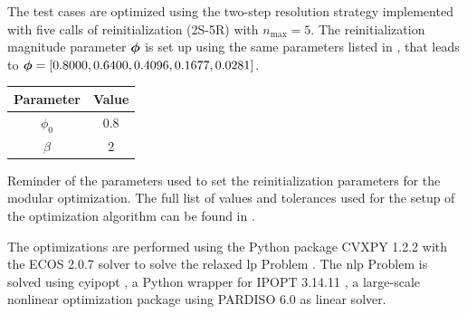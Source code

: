 The test cases are optimized using the two-step resolution strategy implemented with five calls of reinitialization (2S-5R) with $n_{\text{max}}=5$. The reinitialization magnitude parameter $\bm{\phi}$ is set up using the same parameters listed in , that leads to $\bm{\phi} = \left[ 0.8000, 0.6400, 0.4096, 0.1677, 0.0281 \right]$.
\begin{margintable}
        \small
    \centering
    \begin{tabular}{cc}
    \toprule
    \textbf{Parameter} & \textbf{Value} \\ \midrule
    $\phi_0$              & 0.8 \\
    $\beta$             & 2 \\
    \bottomrule
    \end{tabular}
    \caption{Reminder of the parameters used to set the reinitialization parameters for the modular optimization. The full list of values and tolerances used for the setup of the optimization algorithm can be found in .}
    \label{tab:05_param}
\end{margintable}

The optimizations are performed using the Python package CVXPY 1.2.2  with the ECOS 2.0.7  solver to solve the relaxed \gls{lp} Problem . The \gls{nlp} Problem  is solved using cyipopt , a Python wrapper for IPOPT 3.14.11 , a large-scale nonlinear optimization package using PARDISO 6.0  as linear solver. 

